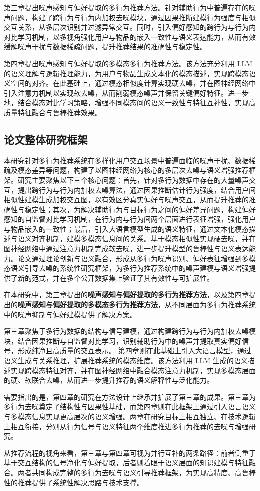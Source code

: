 第三章提出噪声感知与偏好提取的多行为推荐方法。针对辅助行为中普遍存在的噪声问题，构建了跨行为与行为内加权去噪模块，通过因果推断建模行为强度与相似交互关系，从多层次识别并过滤异常交互。同时，引入偏好感知的跨行为与行为内对比学习机制，以多视角强化用户与物品的嵌入一致性与语义表达能力，从而有效缓解噪声干扰与数据稀疏问题，提升推荐结果的准确性与稳定性。

第四章提出噪声感知与偏好提取的多模态多行为推荐方法。该方法充分利用 LLM 的语义理解与逻辑推理能力，为用户与物品生成文本化的模态描述，实现跨模态语义空间的对齐。在此基础上，通过模态相似度计算实现硬去噪，并在图神经网络中引入注意力机制以实现软去噪，从而削弱模态噪声并保留关键偏好特征。进一步地，结合模态对比学习策略，增强不同模态间的语义一致性与特征互补性，实现高质量特征融合与鲁棒推荐效果。

\subsection{论文整体研究框架}
本研究针对多行为推荐系统在多样化用户交互场景中普遍面临的噪声干扰、数据稀疏及模态差异等问题，构建了以图神经网络为核心的多层次去噪与语义增强推荐框架。研究主要聚焦以下三个核心问题：首先，针对多行为数据中存在的大量噪声交互，提出跨行为与行为内加权去噪算法，通过因果推断估计行为强度，结合用户间相似性建模生成加权交互图，以有效区分真实偏好与噪声交互，从而提升推荐的准确性与稳定性；其次，为解决辅助行为与目标行为之间的偏好差异问题，构建偏好感知的自监督对比学习机制，在行为内与行为间两个层面进行表征增强，强化用户与物品嵌入的一致性；最后，引入大语言模型生成的语义特征，通过文本化模态描述与语义对齐机制，建模多模态信息间的关系。基于模态相似性实现硬去噪，并在图神经网络中通过注意力机制完成软去噪，进一步提升模型的鲁棒性与语义表达能力。论文通过理论创新与语义融合，形成从多行为噪声识别、偏好表征增强到多模态语义引导去噪的系统性研究框架，为多行为推荐系统中的噪声建模与语义增强提供了新的范式，并在多个公开数据集上验证了其有效性与可扩展性。

在本研究中，第三章提出的\textbf{噪声感知与偏好提取的多行为推荐方法}，以及第四章提出的\textbf{噪声感知与偏好提取的多模态多行为推荐方法}，从不同层面为多行为推荐系统中的噪声抑制与偏好建模提供了解决方案。

第三章聚焦于多行为数据的结构与信号建模，通过构建跨行为与行为内加权去噪模块，结合因果推断与自监督对比学习，识别辅助行为中的噪声并提取真实偏好信号，形成纯净且高质量的交互表示。  
第四章则在此基础上引入大语言模型，通过语义生成与关系推理，扩展推荐系统的模态维度。该方法利用 LLM 生成的语义描述实现跨模态特征对齐，并在图神经网络中融合模态注意力机制，实现多模态层面的硬、软联合去噪，从而进一步提升推荐的语义解释性与泛化能力。

需要指出的是，第四章的研究在方法设计上继承并扩展了第三章的成果。第三章为多行为去噪奠定了结构性与因果性基础，而第四章则在此框架上通过引入语言语义与多模态信息实现更高层次的语义增强。两章在研究目标上相互独立、在技术逻辑上相互衔接，分别从行为信号与语义特征两个维度推进多行为推荐的去噪与增强研究。

从推荐流程的视角来看，第三章与第四章可视为并行互补的两条路径：前者侧重于基于交互结构的信号净化与偏好提取，后者则着眼于语义层面的知识建模与特征融合。两者共同构成完整的多行为去噪与语义引导推荐框架，为实现高精度、高鲁棒性的推荐提供了系统性解决思路与技术支撑。
